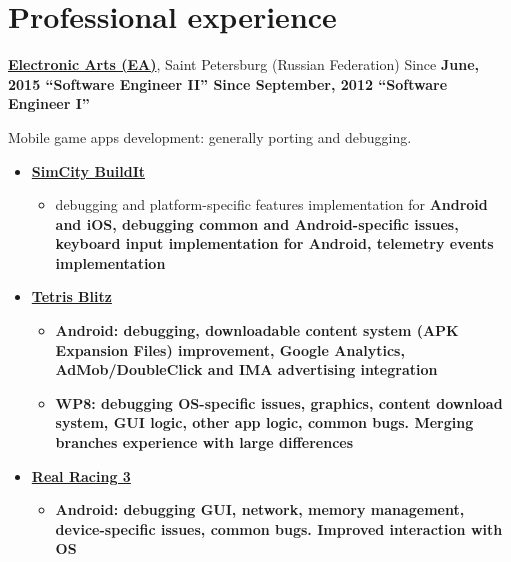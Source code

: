 \section{Professional experience}
{
\fontsize{12pt}{12pt}\selectfont
\href{http://www.ea.com}{\bfseries Electronic Arts (EA)\mdseries},
Saint Petersburg (Russian Federation)
}
\subitem Since \bfseries June, 2015 \mdseries ``Software Engineer II''
\subitem Since \bfseries September, 2012 \mdseries ``Software Engineer I''

\vspace{5pt}
\subitem Mobile game apps development: generally porting and debugging.
\begin{itemize}
\setlength{\itemindent}{20pt}
\item
    \href{http://www.ea.com/simcity-buildit}
        {\bfseries SimCity BuildIt\mdseries}
    \begin{itemize}
        \item debugging and platform-specific features implementation for \bfseries Android \mdseries and \bfseries iOS\mdseries,
	debugging common and Android-specific issues,
	keyboard input implementation for Android,
        telemetry events implementation
    \end{itemize}
\item
    \href{http://www.tetrisblitz.com}
        {\bfseries Tetris Blitz \mdseries}
    \begin{itemize}
        \item \bfseries Android\mdseries:
        debugging,
        downloadable content system (APK Expansion Files) improvement,
        Google Analytics, AdMob/DoubleClick and IMA advertising integration
    \end{itemize}
    \begin{itemize}
        \item \bfseries WP8\mdseries:
        debugging OS-specific issues,
        graphics,
        content download system,
        GUI logic,
        other app logic,
        common bugs.
        Merging branches experience with large differences
    \end{itemize}
\item
    \href{http://firemonkeys.com.au/downloadR3}
    {\bfseries Real Racing 3\mdseries}
    \begin{itemize}
        \item\bfseries Android\mdseries:
        debugging GUI,
        network,
        memory management,
        device-specific issues,
        common bugs.
        Improved interaction with OS
    \end{itemize}
\end{itemize}

